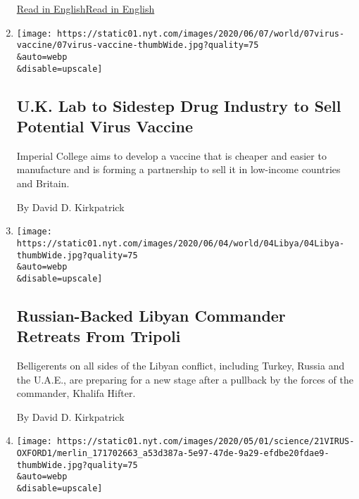 \begin{enumerate}
  \href{https://www.nytimes.com/2020/06/27/world/europe/coronavirus-spread-asymptomatic.html}{Read
  in
  English}\href{https://www.nytimes.com/2020/06/27/world/europe/coronavirus-spread-asymptomatic.html}{Read
  in English}
\item
  \href{/2020/06/07/world/europe/imperial-college-uk-vaccine-coronavirus.html}{}

  \texttt{[image: https://static01.nyt.com/images/2020/06/07/world/07virus-vaccine/07virus-vaccine-thumbWide.jpg?quality=75\\\&auto=webp\\\&disable=upscale]}

  \hypertarget{uk-lab-to-sidestep-drug-industry-to-sell-potential-virus-vaccine}{%
  \subsection{U.K. Lab to Sidestep Drug Industry to Sell Potential Virus
  Vaccine}\label{uk-lab-to-sidestep-drug-industry-to-sell-potential-virus-vaccine}}

  Imperial College aims to develop a vaccine that is cheaper and easier
  to manufacture and is forming a partnership to sell it in low-income
  countries and Britain.

  By David D. Kirkpatrick
\item
  \href{/2020/06/04/world/middleeast/libya-hifter-retreat-russia.html}{}

  \texttt{[image: https://static01.nyt.com/images/2020/06/04/world/04Libya/04Libya-thumbWide.jpg?quality=75\\\&auto=webp\\\&disable=upscale]}

  \hypertarget{russian-backed-libyan-commander-retreats-from-tripoli}{%
  \subsection{Russian-Backed Libyan Commander Retreats From
  Tripoli}\label{russian-backed-libyan-commander-retreats-from-tripoli}}

  Belligerents on all sides of the Libyan conflict, including Turkey,
  Russia and the U.A.E., are preparing for a new stage after a pullback
  by the forces of the commander, Khalifa Hifter.

  By David D. Kirkpatrick
\item
  \href{/2020/05/21/health/coronavirus-vaccine-astrazeneca.html}{}

  \texttt{[image: https://static01.nyt.com/images/2020/05/01/science/21VIRUS-OXFORD1/merlin\_171702663\_a53d387a-5e97-47de-9a29-efdbe20fdae9-thumbWide.jpg?quality=75\\\&auto=webp\\\&disable=upscale]}


\end{enumerate}
